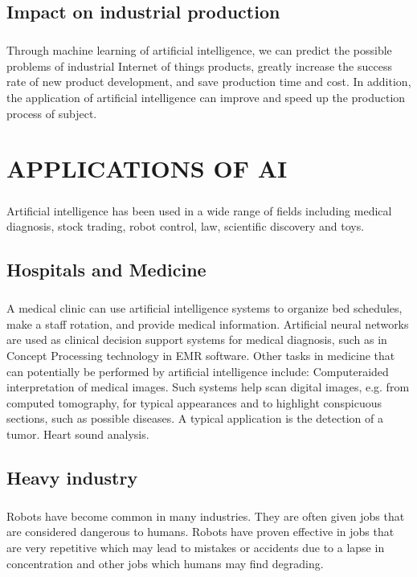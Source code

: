 \documentclass[12pt]{report}
\begin{document}
\section{ Impact on industrial production}
\paragraph{} Through machine learning of artificial intelligence, we can
predict the possible problems of industrial Internet of things products, greatly increase the success
rate of new product development, and save production time and cost. In addition, the application
of artificial intelligence can improve and speed up the production process of subject.
\newpage
 \chapter{APPLICATIONS OF AI}
\paragraph{}   Artificial intelligence has been used in a wide range of fields including medical diagnosis, stock
trading, robot control, law, scientific discovery and toys.
\section{Hospitals and Medicine}
\paragraph{}
A medical clinic can use artificial intelligence systems to organize bed
schedules, make a staff rotation, and provide medical information. Artificial neural networks are used
as clinical decision support systems for medical diagnosis, such as in Concept Processing technology
in EMR software. Other tasks in medicine that can potentially be performed by artificial intelligence
include: Computeraided interpretation of medical images. Such systems help scan digital images, e.g.
from computed tomography, for typical appearances and to highlight conspicuous sections, such as
possible diseases. A typical application is the detection of a tumor. Heart sound analysis.
\section{Heavy industry}
\paragraph{} Robots have become common in many industries. They are often given jobs that
are considered dangerous to humans. Robots have proven effective in jobs that are very repetitive
which may lead to mistakes or accidents due to a lapse in concentration and other jobs which humans
may find degrading.
\end{document}
